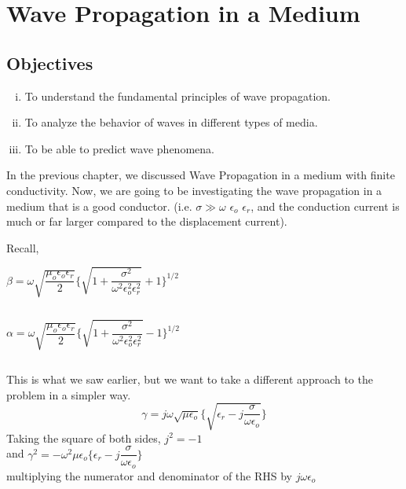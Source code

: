 \chapter{Wave Propagation in a Medium}\label{lec:lec26}

\begin{mdframed}[backgroundcolor=lightblue, linewidth=1pt,  hidealllines=true]
\section{Objectives}
\begin{enumerate}[(i)]
\item To understand the fundamental principles of wave propagation.
\item To analyze the behavior of waves in different types of media.
\item To be able to predict wave phenomena.
\end{enumerate}
\end{mdframed}
In the previous chapter, we discussed Wave Propagation in a medium with finite conductivity. Now, we are going to be investigating the wave propagation in a medium that is a good conductor. (i.e. $\sigma \gg \omega$ $\epsilon_{o}$ $\epsilon_{r}$, and the conduction current is much or far larger compared to the displacement current).

Recall,
\begin{center}
$\beta=\omega\sqrt{\dfrac{\mu_{o}\epsilon_{o}\epsilon_{r}}{2}}\Bigg\{{\sqrt{1+\dfrac{\sigma^{2}}{\omega^{2}\epsilon_{o}^{2}\epsilon_{r}^{2}}}+1 }\Bigg\}^{1/2}$
\end{center}
\begin{equation}\end{equation}

\begin{center}
$\alpha=\omega\sqrt{\dfrac{\mu_{o}\epsilon_{o}\epsilon_{r}}{2}}\Bigg\{\sqrt{1+\dfrac{\sigma^{2}}{\omega^{2}\epsilon_{o}^{2}\epsilon_{r}^{2}}}  -1\Bigg\}^{1/2}$	
\end{center}
\begin{equation}\end{equation}

This is what we saw earlier, but we want to take a different approach to the problem in a simpler way.
\begin{equation}
\gamma=j\omega\sqrt{\mu\epsilon_{o}}\Bigg\{\sqrt{\epsilon_{r}-j\dfrac{\sigma}{\omega\epsilon_{o}}}\Bigg\}
\end{equation}		
Taking the square of both sides,
$j^{2}= -1$\\ 
and $\gamma^{2}=-\omega^{2}\mu\epsilon_{o}\Bigg\{\epsilon_{r}-j\dfrac{\sigma}{\omega\epsilon_{o}}\Bigg\}$\\
\begin{equation}\end{equation}
multiplying the numerator and denominator of the RHS  by $j\omega\epsilon_{o}$

